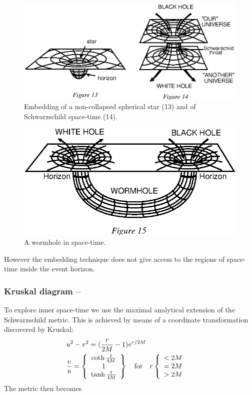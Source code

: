 \documentclass[12pt]{article}
\begin{document}
\begin{figure}[htb]
\renewcommand \thefigure {13\&14}
  \begin{center}
    \leavevmode
    \includegraphics{embed.ps}
    \caption{Embedding of a non-collapsed spherical star (13) and of
      Schwarzschild space-time (14).}
  \end{center}
\end{figure}
\setcounter{figure}{14}
\begin{figure}[htb]
  \begin{center}
    \leavevmode
    \includegraphics{worm.ps}      
    \caption{A wormhole in space-time.}
  \end{center}
\end{figure}
However the embedding technique does not give access to the regions of 
space-time inside the event horizon.  

\subsubsection{Kruskal diagram --}

To explore inner space-time we use the maximal analytical extension 
of the Schwarzschild metric. This is achieved by means of a coordinate 
transformation discovered by Kruskal: 
\begin{eqnarray}
\lefteqn{u^{2} - v^{2} = (\frac{r}{2M}-1)e^{r/2M}}\nonumber\\
 & 
\frac{v}{u} = 
\left\{\begin{array}{c}\coth {t\over4M}\\1\\\tanh {t\over4M}\end{array}\right\}
\quad\textrm{for}\quad
r\left\{\begin{array}{c}<2M\\=2M\\>2M\end{array}\right.
\end{eqnarray}
The metric then becomes
\end{document}
